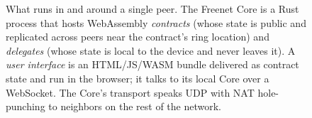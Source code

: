 \begin{figure}[t]
\begin{tikzpicture}
\end{tikzpicture}
\caption{What runs in and around a single peer. The Freenet Core is
a Rust process that hosts WebAssembly \emph{contracts} (whose state
is public and replicated across peers near the contract's ring
location) and \emph{delegates} (whose state is local to the device
and never leaves it). A \emph{user interface} is an HTML/JS/WASM
bundle delivered as contract state and run in the browser; it talks
to its local Core over a WebSocket. The Core's transport speaks UDP
with NAT hole-punching to neighbors on the rest of the network.}
\label{fig:peer-architecture}
\end{figure}
